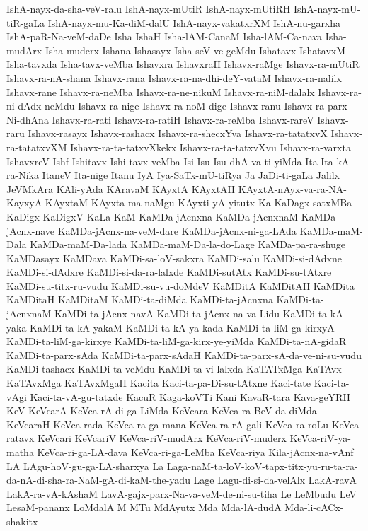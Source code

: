 {IshA-nayx-da-sha-veV-ralu
IshA-nayx-mUtiR
IshA-nayx-mUtiRH
IshA-nayx-mU-tiR-gaLa
IshA-nayx-mu-Ka-diM-dalU
IshA-nayx-vakatxrXM
IshA-nu-garxha
IshA-paR-Na-veM-daDe
Isha
IshaH
Isha-lAM-CanaM
Isha-lAM-Ca-nava
Isha-mudArx
Isha-muderx
Ishana
Ishasayx
Isha-seV-ve-geMdu
Ishatavx
IshatavxM
Isha-tavxda
Isha-tavx-veMba
Ishavxra
IshavxraH
Ishavx-raMge
Ishavx-ra-mUtiR
Ishavx-ra-nA-shana
Ishavx-rana
Ishavx-ra-na-dhi-deY-vataM
Ishavx-ra-nalilx
Ishavx-rane
Ishavx-ra-neMba
Ishavx-ra-ne-nikuM
Ishavx-ra-niM-dalalx
Ishavx-ra-ni-dAdx-neMdu
Ishavx-ra-nige
Ishavx-ra-noM-dige
Ishavx-ranu
Ishavx-ra-parx-Ni-dhAna
Ishavx-ra-rati
Ishavx-ra-ratiH
Ishavx-ra-reMba
Ishavx-rareV
Ishavx-raru
Ishavx-rasayx
Ishavx-rashacx
Ishavx-ra-shecxYva
Ishavx-ra-tatatxvX
Ishavx-ra-tatatxvXM
Ishavx-ra-ta-tatxvXkekx
Ishavx-ra-ta-tatxvXvu
Ishavx-ra-varxta
IshavxreV
Ishf
Ishitavx
Ishi-tavx-veMba
Isi
Isu
Isu-dhA-va-ti-yiMda
Ita
Ita-kA-ra-Nika
ItaneV
Ita-nige
Itanu
IyA
Iya-SaTx-mU-tiRya
Ja
JaDi-ti-gaLa
Jalilx
JeVMkAra
KAli-yAda
KAravaM
KAyxtA
KAyxtAH
KAyxtA-nAyx-va-ra-NA-KayxyA
KAyxtaM
KAyxta-ma-naMgu
KAyxti-yA-yitutx
Ka
KaDagx-satxMBa
KaDigx
KaDigxV
KaLa
KaM
KaMDa-jAcnxna
KaMDa-jAcnxnaM
KaMDa-jAcnx-nave
KaMDa-jAcnx-na-veM-dare
KaMDa-jAcnx-ni-ga-LAda
KaMDa-maM-Dala
KaMDa-maM-Da-lada
KaMDa-maM-Da-la-do-Lage
KaMDa-pa-ra-shuge
KaMDasayx
KaMDava
KaMDi-sa-loV-sakxra
KaMDi-salu
KaMDi-si-dAdxne
KaMDi-si-dAdxre
KaMDi-si-da-ra-lalxde
KaMDi-sutAtx
KaMDi-su-tAtxre
KaMDi-su-titx-ru-vudu
KaMDi-su-vu-doMdeV
KaMDitA
KaMDitAH
KaMDita
KaMDitaH
KaMDitaM
KaMDi-ta-diMda
KaMDi-ta-jAcnxna
KaMDi-ta-jAcnxnaM
KaMDi-ta-jAcnx-navA
KaMDi-ta-jAcnx-na-va-Lidu
KaMDi-ta-kA-yaka
KaMDi-ta-kA-yakaM
KaMDi-ta-kA-ya-kada
KaMDi-ta-liM-ga-kirxyA
KaMDi-ta-liM-ga-kirxye
KaMDi-ta-liM-ga-kirx-ye-yiMda
KaMDi-ta-nA-gidaR
KaMDi-ta-parx-sAda
KaMDi-ta-parx-sAdaH
KaMDi-ta-parx-sA-da-ve-ni-su-vudu
KaMDi-tashacx
KaMDi-ta-veMdu
KaMDi-ta-vi-lalxda
KaTATxMga
KaTAvx
KaTAvxMga
KaTAvxMgaH
Kacita
Kaci-ta-pa-Di-su-tAtxne
Kaci-tate
Kaci-ta-vAgi
Kaci-ta-vA-gu-tatxde
KacuR
Kaga-koVTi
Kani
KavaR-tara
Kava-geYRH
KeV
KeVcarA
KeVca-rA-di-ga-LiMda
KeVcara
KeVca-ra-BeV-da-diMda
KeVcaraH
KeVca-rada
KeVca-ra-ga-mana
KeVca-ra-rA-gali
KeVca-ra-roLu
KeVca-ratavx
KeVcari
KeVcariV
KeVca-riV-mudArx
KeVca-riV-muderx
KeVca-riV-ya-matha
KeVca-ri-ga-LA-dava
KeVca-ri-ga-LeMba
KeVca-riya
Kila-jAcnx-na-vAnf
LA
LAgu-hoV-gu-ga-LA-sharxya
La
Laga-naM-ta-loV-koV-tapx-titx-yu-ru-ta-ra-da-nA-di-sha-ra-NaM-gA-di-kaM-the-yadu
Lage
Lagu-di-si-da-velAlx
LakA-ravA
LakA-ra-vA-kAshaM
LavA-gajx-parx-Na-va-veM-de-ni-su-tiha
Le
LeMbudu
LeV
LesaM-pananx
LoMdalA
M
MTu
MdAyutx
Mda
Mda-lA-dudA
Mda-li-cACx-shakitx
}
